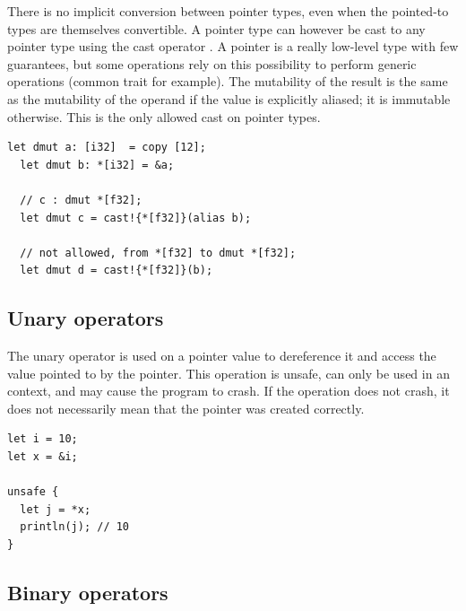 There is no implicit conversion between pointer types, even when the pointed-to
types are themselves convertible. A pointer type can however be cast to any
pointer type using the cast operator . A pointer is a really low-level type with few guarantees,
but some operations rely on this possibility to perform generic operations
(common trait  for example). The mutability of the result is
the same as the mutability of the operand if the value is explicitly aliased; it is
immutable otherwise. This is the only allowed cast on pointer types.
\smallskip

\begin{lstlisting}[style=coloredverbatimError]
  let dmut a: [i32]  = copy [12];
  let dmut b: *[i32] = &a;

  // c : dmut *[f32];
  let dmut c = cast!{*[f32]}(alias b);

  // not allowed, from *[f32] to dmut *[f32];
  let dmut d = cast!{*[f32]}(b);
\end{lstlisting}

\subsection{Unary operators}

The unary operator \token{*} is used on a pointer value to dereference it and
access the value pointed to by the pointer. This operation is unsafe, can only
be used in an  context, and may cause the program to crash. If the
operation does not crash, it does not necessarily mean that the pointer was
created correctly.
\smallskip

\begin{lstlisting}[style=coloredverbatim]
let i = 10;
let x = &i;

unsafe {
  let j = *x;
  println(j); // 10
}
\end{lstlisting}

\subsection{Binary operators}


